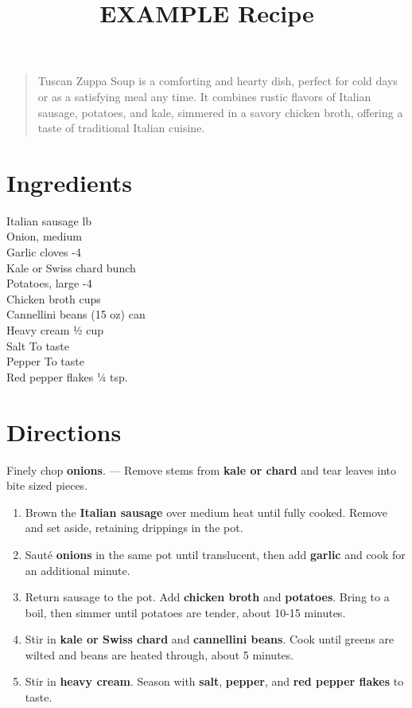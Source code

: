 \documentclass[11pt,letterpaper]{article}
\title{EXAMPLE Recipe}
\author{}
\date{}
\begin{document}
\maketitle

\begin{quote}
\small
\begin{em}
Tuscan Zuppa Soup is a comforting and hearty dish, perfect for cold days or as a satisfying meal any time. It combines rustic flavors of Italian sausage, potatoes, and kale, simmered in a savory chicken broth, offering a taste of traditional Italian cuisine.
\end{em}
\end{quote}

\section*{Ingredients}
\setlength{\columnsep}{20pt}
\begin{multicols}{2}
\noindent
    Italian sausage  lb \\
    Onion, medium  \\
    Garlic cloves -4 \\
    Kale or Swiss chard  bunch \\
    Potatoes, large -4 \\
    \columnbreak
    Chicken broth  cups \\
    Cannellini beans  (15 oz) can \\
    Heavy cream \dotfill ½ cup \\
    Salt \dotfill To taste \\
    Pepper \dotfill To taste \\
    Red pepper flakes \dotfill ¼ tsp.
\end{multicols}

\section*{Directions}

\noindent
Finely chop \textbf{onions}. --- 
Remove stems from \textbf{kale or chard} and tear leaves into bite sized pieces.

\begin{enumerate}
    \item Brown the \textbf{Italian sausage} over medium heat until fully cooked. Remove and set aside, retaining drippings in the pot.
    \item Sauté \textbf{onions} in the same pot until translucent, then add \textbf{garlic} and cook for an additional minute.
    \item Return sausage to the pot. Add \textbf{chicken broth} and \textbf{potatoes}. Bring to a boil, then simmer until potatoes are tender, about 10-15 minutes.
    \item Stir in \textbf{kale or Swiss chard} and \textbf{cannellini beans}. Cook until greens are wilted and beans are heated through, about 5 minutes.
    \item Stir in \textbf{heavy cream}. Season with \textbf{salt}, \textbf{pepper}, and \textbf{red pepper flakes} to taste.
\end{enumerate}
\end{document}

